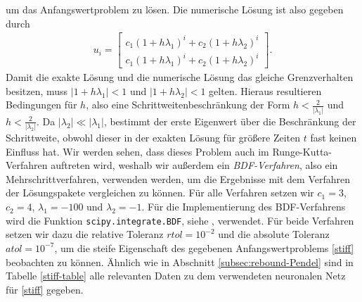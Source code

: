um das Anfangswertproblem zu lösen. Die numerische Lösung ist also gegeben durch
\begin{align*}
       u_{i}=
       \begin{bmatrix}
              c_1 (1+h\lambda_1)^{i} + c_2 (1+h\lambda_2)^{i}\\
              c_1 (1+h\lambda_1)^{i} + c_2 (1+h\lambda_2)^{i}
       \end{bmatrix}.
\end{align*}
Damit die exakte Lösung und die numerische Lösung das gleiche Grenzverhalten besitzen, muss $|1 + h\lambda_1|<1$ und
$|1 + h\lambda_2|<1$ gelten. Hieraus resultieren Bedingungen für $h$, also eine Schrittweitenbeschränkung der Form
$h<\frac{2}{|\lambda_1|}$ und $h<\frac{2}{|\lambda_2|}$. Da $|\lambda_2| \ll |\lambda_1|$, bestimmt der erste Eigenwert
über die Beschränkung der Schrittweite, obwohl dieser in der exakten Lösung für größere Zeiten $t$ fast keinen Einfluss
hat. Wir werden sehen, dass dieses Problem auch im Runge-Kutta-Verfahren auftreten wird, weshalb wir außerdem ein
\textit{BDF-Verfahren}, also ein Mehrschrittverfahren, verwenden werden, um die Ergebnisse mit dem Verfahren der
Lösungspakete vergleichen zu können. Für alle Verfahren setzen wir $c_1=3$, $c_2=4$, $\lambda_1 = -100$ und $\lambda_2=-1$.
Für die Implementierung des BDF-Verfahrens wird die Funktion \texttt{scipy.integrate.BDF}, siehe
\cite{ScipyIntegrateBDF}, verwendet. Für beide Verfahren setzen wir dazu die relative Toleranz $rtol=10^{-2}$ und die
absolute Toleranz $atol=10^{-7}$, um die steife Eigenschaft des gegebenen Anfangswertproblems \eqref{stiff} beobachten
zu können. Ähnlich wie in Abschnitt \ref{subsec:rebound-Pendel} sind in Tabelle \ref{stiff-table} alle relevanten Daten
zu dem verwendeten neuronalen Netz für \eqref{stiff} gegeben.
